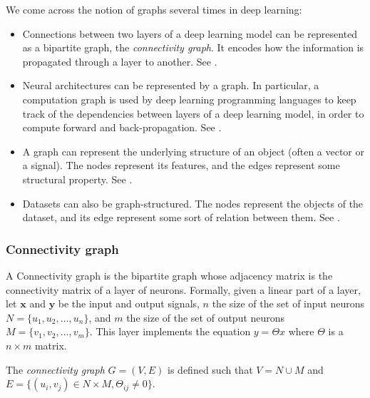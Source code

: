 \begin{definition}
We come across the notion of graphs several times in deep learning:
\begin{itemize}
\item Connections between two layers of a deep learning model can be represented as a bipartite graph, the \emph{connectivity graph}. It encodes how the information is propagated through a layer to another. See .
\item Neural architectures can be represented by a graph. In particular, a computation graph is used by deep learning programming languages to keep track of the dependencies between layers of a deep learning model, in order to compute forward and back-propagation. See .
\item A graph can represent the underlying structure of an object (often a vector or a signal). The nodes represent its features, and the edges represent some structural property. See .
\item Datasets can also be graph-structured. The nodes represent the objects of the dataset, and its edge represent some sort of relation between them. See .
\end{itemize}


\subsubsection{Connectivity graph}
\label{con_graph}

A Connectivity graph is the bipartite graph whose adjacency matrix is the connectivity matrix of a layer of neurons.
Formally, given a linear part of a layer, let $\textbf{x}$ and $\textbf{y}$ be the input and output signals, $n$ the size of the set of input neurons $N = \{u_1, u_2, \ldots, u_n\}$, and $m$ the size of the set of output neurons $M = \{v_1, v_2, \ldots, v_m\}$. This layer implements the equation $y = \Theta x$ where $\Theta$ is a $n \times m$ matrix.

\begin{definition}
{The \emph{connectivity graph} $G = (V,E)$ is defined such that $V = N \cup M$ and $E = \{(u_i,v_j) \in  N \times M, \Theta_{ij} \neq 0 \} $.}
\end{definition}


\end{definition}
